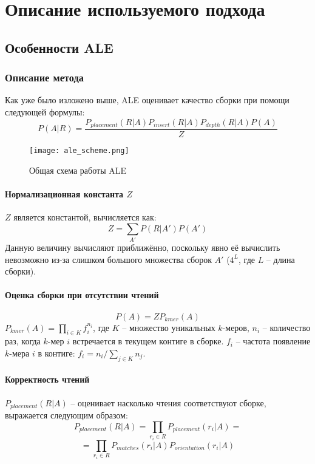 \chapter{Описание используемого подхода}
\label{chapter2} 

\section{Особенности ALE}
\subsection{Описание метода}

Как уже было изложено выше, ALE оценивает качество сборки при помощи следующей формулы:
$$P(A|R)=\frac{P_{placement}(R|A)P_{insert}(R|A)P_{depth}(R|A)P(A)}{Z}$$

\begin{figure}[h]
\texttt{[image: ale\_scheme.png]}
\caption{Общая схема работы ALE}
\label{fig:ALECommon}
\end{figure}

\subsubsection{Нормализационная константа $Z$}
$Z$ является константой, вычисляется как: 
$$Z = \sum_{A'}P(R|A')P(A')$$ Данную величину  вычисляют приближённо, поскольку явно её вычислить невозможно из-за слишком большого множества сборок $A'$ ($4^L$, где $L$ – длина сборки).

\subsubsection{Оценка сборки при отсутствии чтений}
$$P(A) = Z P_{kmer}(A)$$
$P_{kmer}(A) = \prod_{i \in K}f_{i}^{n_{i}}$, где $K$ – множество уникальных $k$-меров, $n_i$ – количество раз, когда $k$-мер $i$ встречается в текущем контиге в сборке. $f_i$ – частота появление $k$-мера $i$ в контиге: $f_i = n_i / \sum_{j \in K} n_j$.

\subsubsection{Корректность чтений}
$P_{placement}(R|A)$ -- оценивает насколько чтения соответствуют сборке, выражается следующим образом:$$P_{placement}(R|A)=\prod_{r_i \in R}P_{placement}(r_i|A)=$$
$$=\prod_{r_i \in R}P_{matches}(r_i|A)P_{orientation}(r_i|A)$$

